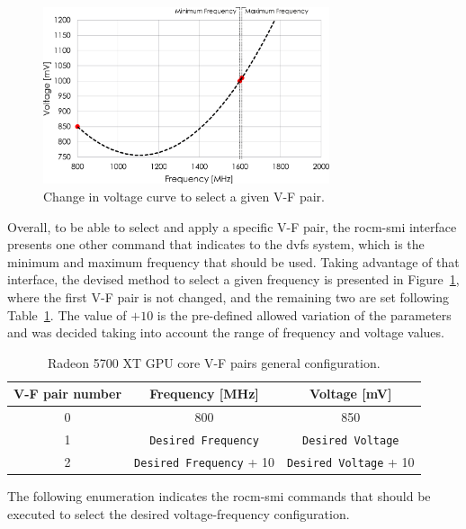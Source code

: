 \begin{figure}[htb]
    \centering
\includegraphics[width=0.75\textwidth]{Figures/AnnexA/vegadvfscontrol.pdf}
        \caption{Change in voltage curve to select a given V-F pair.}
    \label{fig:voltagecurvepair}
\end{figure}

Overall, to be able to select and apply a specific V-F pair, the rocm-smi interface presents one other command that indicates to the \acrshort{dvfs} system, which is the minimum and maximum frequency that should be used. Taking advantage of that interface, the devised method to select a given frequency is presented in Figure~\ref{fig:voltagecurvepair}, where the first V-F pair is not changed, and the remaining two are set following Table~\ref{tab:xt-pairs}. The value of $+10$ is the pre-defined allowed variation of the parameters and was decided taking into account the range of frequency and voltage values.



\begin{table}[!htb]
\centering
\begin{tabular}{ccc}
\textbf{V-F pair number} & \textbf{Frequency {[}MHz{]}} & \textbf{Voltage {[}mV{]}}  \\ \hline
0              & 800                          & 850                        \\
1              & \texttt{Desired Frequency}   & \texttt{Desired Voltage}                        \\
2              & \texttt{Desired Frequency} + 10   & \texttt{Desired Voltage} + 10                        \\\hline
\end{tabular}
\caption{Radeon 5700 XT GPU core V-F pairs general configuration.}
\label{tab:xt-pairs}
\end{table}


The following enumeration indicates the rocm-smi commands that should be executed to select the desired voltage-frequency configuration.

